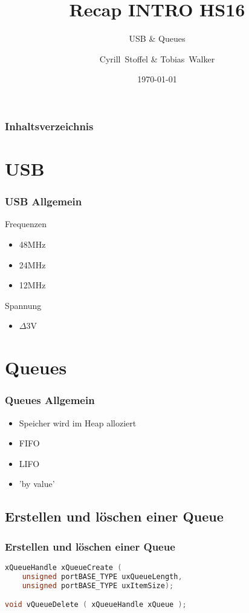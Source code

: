 \documentclass{beamer}
\title{Recap INTRO HS16}
\subtitle{USB \& Queues}
\author[Stoffel, Walker] %
{Cyrill~Stoffel \& Tobias~Walker}
\date{\today}
\begin{document}
	
	\frame{\titlepage}

	
	\begin{frame}
		\frametitle{Inhaltsverzeichnis}
		\tableofcontents
	\end{frame}

	\section{USB}
	\begin{frame}
			\frametitle{USB Allgemein}
				Frequenzen
				\begin{itemize}
					\item 48MHz
					\item 24MHz
					\item 12MHz
				\end{itemize}
				Spannung
				\begin{itemize}
					\item $\Delta 3$V													
				\end{itemize}
	\end{frame}
	
	\section{Queues}
	\begin{frame}
		\frametitle{Queues Allgemein}
		\begin{itemize}
			\item	Speicher wird im Heap alloziert
			\item	FIFO
			\item	LIFO
			\item	'by value'
		\end{itemize}
	\end{frame}

	\subsection{Erstellen und löschen einer Queue}
\begin{frame}[fragile]
\frametitle{Erstellen und löschen einer Queue}
\begin{lstlisting}[language = C]
xQueueHandle xQueueCreate ( 
	unsigned portBASE_TYPE uxQueueLength,
	unsigned portBASE_TYPE uxItemSize);

void vQueueDelete ( xQueueHandle xQueue );	
\end{lstlisting}
\end{frame}
	
\end{document}
